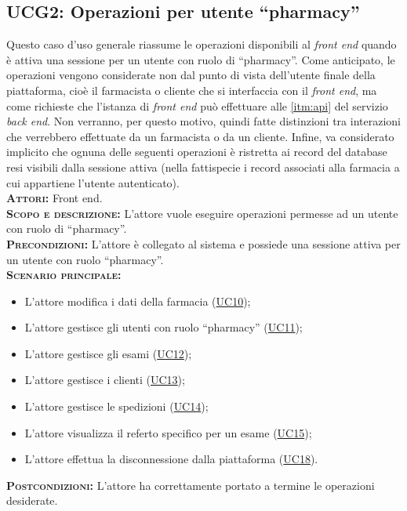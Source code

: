 \subsection{UCG2: Operazioni per utente ``pharmacy''}
\label{sec:UCG2}
Questo caso d'uso generale riassume le operazioni disponibili al \textit{front end} quando è attiva una sessione per un utente con ruolo di ``pharmacy''. Come anticipato, le operazioni vengono considerate non dal punto di vista dell'utente finale della piattaforma, cioè il farmacista o cliente che si interfaccia con il \textit{front end}, ma come richieste che l'istanza di \textit{front end} può effettuare alle \ref{itm:api} del servizio \textit{back end}. Non verranno, per questo motivo, quindi fatte distinzioni tra interazioni che verrebbero effettuate da un farmacista o da un cliente. Infine, va considerato implicito che ognuna delle seguenti operazioni è ristretta ai record del database resi visibili dalla sessione attiva (nella fattispecie i record associati alla farmacia a cui appartiene l'utente autenticato).\\
\textsc{\textbf{Attori:}} Front end.\\
\textsc{\textbf{Scopo e descrizione:}} L'attore vuole eseguire operazioni permesse ad un utente con ruolo di ``pharmacy''.\\
\textsc{\textsc{\textbf{Precondizioni:}}} L'attore è collegato al sistema e possiede una sessione attiva per un utente con ruolo ``pharmacy''.\\
\textsc{\textbf{Scenario principale:}} 
\begin{itemize}
    \item L'attore modifica i dati della farmacia (\hyperref[sec:UC10]{UC10});
    \item L'attore gestisce gli utenti con ruolo ``pharmacy'' (\hyperref[sec:UC11]{UC11});
    \item L'attore gestisce gli esami (\hyperref[sec:UC12]{UC12});
    \item L'attore gestisce i clienti (\hyperref[sec:UC13]{UC13});
    \item L'attore gestisce le spedizioni (\hyperref[sec:UC14]{UC14});
    \item L'attore visualizza il referto specifico per un esame (\hyperref[sec:UC15]{UC15});
    \item L'attore effettua la disconnessione dalla piattaforma (\hyperref[sec:UC18]{UC18}).
\end{itemize}
\textsc{\textbf{Postcondizioni:}} L'attore ha correttamente portato a termine le operazioni desiderate.

